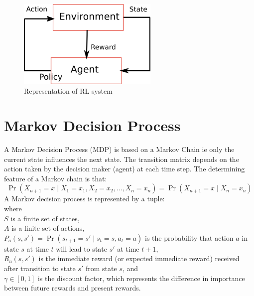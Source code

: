 \documentclass[hidelinks,BTech]{iitmdiss}
\begin{document}
\begin{figure}[H]
  \centering
    \includegraphics[width=0.6\textwidth]{RL.png}
    \caption{Representation of RL system}
\end{figure}

\section {Markov Decision Process}
A Markov Decision Process (MDP) is based on a Markov Chain ie only the current state influences the next state. The transition matrix depends on the action taken by the decision maker (agent) at each time step. The determining feature of a Markov chain is that:
\begin{equation}
\Pr(X_{n+1}=x\mid X_1=x_1, X_2=x_2, \ldots, X_n=x_n) = \Pr(X_{n+1}=x\mid X_n=x_n)
\end{equation}
A Markov decision process is represented by a tuple:
\begin{equation}
[S, A, P_a(s,s'), R_a(s,s'), \gamma]
\end{equation}
where\\
$S$ is a finite set of states,\\
$A$ is a finite set of actions,\\
$P_a(s,s') = \Pr(s_{t+1}=s' \mid s_t=s, a_t=a)$ is the probability that action $a$ in state $s$ at time $t$ will lead to state $s'$ at time $t+1$,\\
$R_a(s,s')$ is the immediate reward (or expected immediate reward) received after transition to state $s'$ from state $s$, and\\
$\gamma \in [0,1]$ is the discount factor, which represents the difference in importance between future rewards and present rewards.
\end{document}
